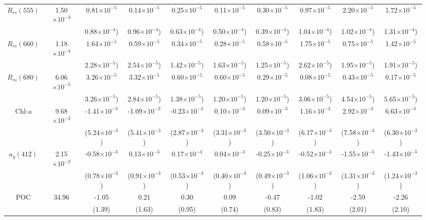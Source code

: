 \documentclass[preview]{standalone}
\begin{document}
\begin{threeparttable}
\begin{tabular}{cccccccccc}
$R_{rs}(555)$ & 1.50$\times10^{-3}$	& 0.81$\times10^{-5}$  	&  0.14$\times10^{-5}$  	&  0.25$\times10^{-5}$  	&  0.11$\times10^{-5}$  	&  0.30$\times10^{-5}$  	&  0.97$\times10^{-5}$  	&  2.20$\times10^{-5}$  	&  1.72$\times10^{-5}$ \\
			  &						& 0.88$\times10^{-4}$) 	& 0.96$\times10^{-4}$) 		& 0.63$\times10^{-4}$) 		& 0.50$\times10^{-4}$) 		& 0.39$\times10^{-4}$) 		& 1.04$\times10^{-4}$) 		& 1.02$\times10^{-4}$) 		& 1.31$\times10^{-4}$) \\ \hline
$R_{rs}(660)$ & 1.18$\times10^{-4}$	& 1.64$\times10^{-5}$ 	&   0.59$\times10^{-5}$ 	&   0.34$\times10^{-5}$ 	&   0.28$\times10^{-5}$ 	&   0.58$\times10^{-5}$ 	&   1.75$\times10^{-5}$ 	&   0.75$\times10^{-5}$ 	&   1.42$\times10^{-5}$ \\
			  &						& 2.28$\times10^{-5}$) 	& 2.54$\times10^{-5}$) 		& 1.42$\times10^{-5}$) 		& 1.63$\times10^{-5}$) 		& 1.25$\times10^{-5}$) 		& 2.62$\times10^{-5}$) 		& 1.95$\times10^{-5}$) 		& 1.91$\times10^{-5}$) \\ \hline
$R_{rs}(680)$ & 6.06$\times10^{-5}$	& 3.26$\times10^{-5}$ 	&   3.32$\times10^{-5}$ 	&   0.60$\times10^{-5}$ 	&   0.60$\times10^{-5}$ 	&   0.29$\times10^{-5}$ 	&   0.08$\times10^{-5}$ 	&   0.43$\times10^{-5}$ 	&   0.17$\times10^{-5}$ \\
			  &						& 3.26$\times10^{-5}$) 	& 2.84$\times10^{-5}$) 		& 1.38$\times10^{-5}$) 		& 1.20$\times10^{-5}$) 		& 1.20$\times10^{-5}$) 		& 3.06$\times10^{-5}$) 		& 4.54$\times10^{-5}$) 		& 5.65$\times10^{-5}$) \\ \hline
Chl-\it{a}    & 9.68$\times10^{-2}$ & -1.41$\times10^{-3}$ 	&   -1.09$\times10^{-3}$ 	&   -0.23$\times10^{-3}$ 	&    0.10$\times10^{-3}$ 	&    0.09$\times10^{-3}$ 	&    1.16$\times10^{-3}$ 	&    2.92$\times10^{-3}$ 	&    6.63$\times10^{-3}$ \\ 
	  		  &						& (5.24$\times10^{-3}$) &  (5.41$\times10^{-3}$) 	&  (2.87$\times10^{-3}$) 	&  (3.31$\times10^{-3}$) 	&  (3.50$\times10^{-3}$) 	&  (6.17$\times10^{-3}$) 	&  (7.58$\times10^{-3}$) 	&  (6.30$\times10^{-3}$) \\ \hline
$a_{g}(412)$  & 2.15$\times10^{-2}$ & -0.58$\times10^{-3}$ 	&    0.13$\times10^{-3}$ 	&    0.17$\times10^{-3}$ 	&    0.04$\times10^{-3}$ 	&   -0.25$\times10^{-3}$ 	&   -0.52$\times10^{-3}$ 	&   -1.55$\times10^{-3}$ 	&   -1.43$\times10^{-3}$ \\ 
			  &						& (0.78$\times10^{-3}$) &  (0.91$\times10^{-3}$) 	&  (0.53$\times10^{-3}$) 	&  (0.40$\times10^{-3}$) 	&  (0.49$\times10^{-3}$) 	&  (1.06$\times10^{-3}$) 	&  (1.31$\times10^{-3}$) 	&  (1.24$\times10^{-3}$) \\ \hline
POC		      & 34.96 				& -1.05 				&    0.21 					&    0.30 					&    0.09 					&   -0.47 					&   -1.02 					&   -2.59 					&   -2.26 \\ 
			  &						&  (1.39) 				&  (1.63) 					&  (0.95) 					&  (0.74) 					&  (0.83) 					&  (1.83) 					&  (2.01) 					&  (2.10) \\ \hline


\end{tabular}
\end{threeparttable}
\end{document}

